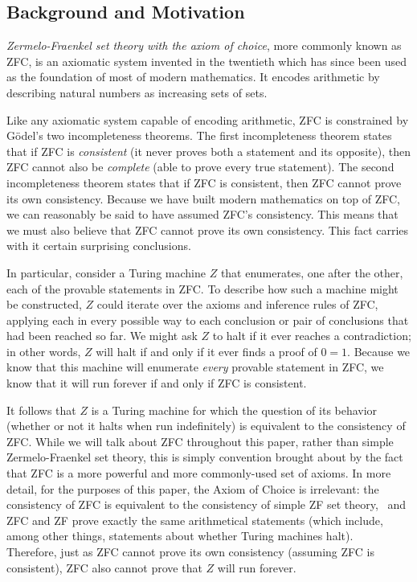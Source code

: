 \documentclass[11pt]{article}
\begin{document}
\subsection{Background and Motivation \label{sec:background}}

\emph{Zermelo-Fraenkel set theory with the axiom of choice}, more commonly known as ZFC, is an axiomatic system invented in the twentieth which has since been used as the foundation of most of modern mathematics. It encodes arithmetic by describing natural numbers as increasing sets of sets. 

Like any axiomatic system capable of encoding arithmetic, ZFC is constrained by G\"{o}del's two incompleteness theorems. The first incompleteness theorem states that if ZFC is \emph{consistent} (it never proves both a statement and its opposite), then ZFC cannot also be \emph{complete} (able to prove every true statement). The second incompleteness theorem states that if ZFC is consistent, then ZFC cannot prove its own consistency. Because we have built modern mathematics on top of ZFC, we can reasonably be said to have assumed ZFC's consistency. This means that we must also believe that ZFC cannot prove its own consistency. This fact carries with it certain surprising conclusions. 

In particular, consider a Turing machine $Z$ that enumerates, one after the other, each of the provable statements in ZFC. To describe how such a machine might be constructed, $Z$ could iterate over the axioms and inference rules of ZFC, applying each in every possible way to each conclusion or pair of conclusions that had been reached so far. We might ask $Z$ to halt if it ever reaches a contradiction; in other words, $Z$ will halt if and only if it ever finds a proof of $0 = 1$. Because we know that this machine will enumerate \emph{every} provable statement in ZFC, we know that it will run forever if and only if ZFC is consistent. 

It follows that $Z$ is a Turing machine for which the question of its behavior (whether or not it halts when run indefinitely) is equivalent to the consistency of ZFC. While we will talk about ZFC throughout this paper, rather than simple Zermelo-Fraenkel set theory, this is simply convention brought about by the fact that ZFC is a more powerful and more commonly-used set of axioms. In more detail, for the purposes of this paper, the Axiom of Choice is irrelevant: the consistency of ZFC is equivalent to the consistency of simple ZF set theory,~\cite{godelcohen} and ZFC and ZF prove exactly the same arithmetical statements (which include, among other things, statements about whether Turing machines halt).~\cite{schoenfield} Therefore, just as ZFC cannot prove its own consistency (assuming ZFC is consistent), ZFC also cannot prove that $Z$ will run forever. 
\end{document}
